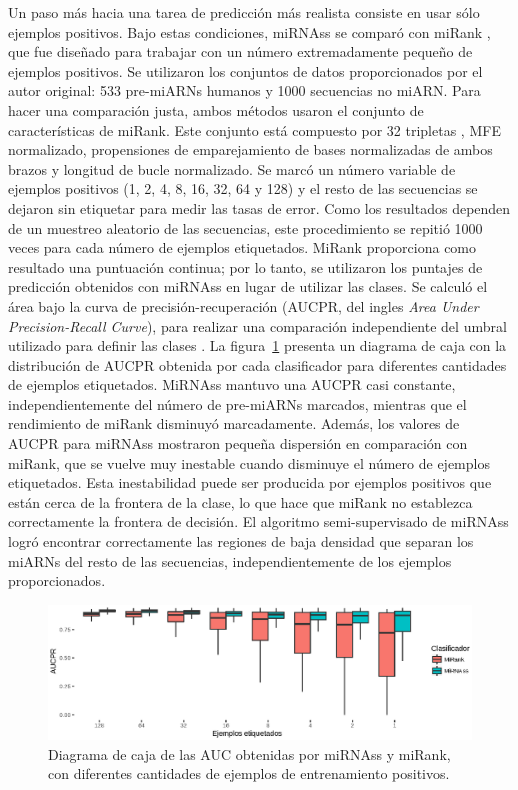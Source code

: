 Un paso más hacia una tarea de predicción más realista consiste en usar sólo ejemplos positivos. Bajo estas condiciones, miRNAss se comparó con miRank
\citep{xu2008microrna}, que fue diseñado para trabajar con un número extremadamente pequeño de ejemplos positivos. Se utilizaron los conjuntos de datos
proporcionados por el autor original: 533 pre-miARNs humanos y 1000 secuencias no miARN. Para hacer una comparación justa, ambos métodos usaron el conjunto
de características de miRank. Este conjunto está compuesto por 32 tripletas \citep{xue2005classification}, MFE normalizado, propensiones de emparejamiento de
bases normalizadas de ambos brazos y longitud de bucle normalizado. Se marcó un número variable de ejemplos positivos (1, 2, 4, 8, 16, 32, 64 y 128) y el
resto de las secuencias se dejaron sin etiquetar para medir las tasas de error. Como los resultados dependen de un muestreo aleatorio de las secuencias, este
procedimiento se repitió 1000 veces para cada número de ejemplos etiquetados. MiRank proporciona como resultado una puntuación continua; por lo tanto, se
utilizaron los puntajes de predicción obtenidos con miRNAss en lugar de utilizar las clases. Se calculó el área bajo la curva de precisión-recuperación
(AUCPR, del ingles \textit{Area Under Precision-Recall Curve}), para realizar una comparación independiente del umbral utilizado para definir las clases
\citep{bradley1997use}.
La figura~\ref{fig:miRank} presenta un diagrama de caja con la distribución de AUCPR obtenida por cada clasificador para diferentes cantidades de ejemplos
etiquetados. MiRNAss mantuvo una AUCPR casi constante, independientemente del número de pre-miARNs marcados, mientras que el rendimiento de miRank disminuyó
marcadamente. Además, los valores de AUCPR para miRNAss mostraron pequeña dispersión en comparación con miRank, que se vuelve muy inestable cuando
disminuye el número de ejemplos etiquetados. Esta inestabilidad puede ser producida por ejemplos positivos que están cerca de la frontera de la clase, lo que
hace que miRank no establezca correctamente la frontera de decisión. El algoritmo semi-supervisado de miRNAss logró encontrar correctamente las regiones de
baja densidad que separan los miARNs del resto de las secuencias, independientemente de los ejemplos proporcionados.

\begin{figure}[tpb]
	\centering
	\includegraphics[width=\linewidth]{fig/few_samples_miRank.eps}
	\caption[$AUC$ con pocos ejemplos positivos]{Diagrama de caja de las AUC obtenidas por miRNAss y miRank, con diferentes cantidades de ejemplos de entrenamiento positivos.}
	\label{fig:miRank}
\end{figure}

